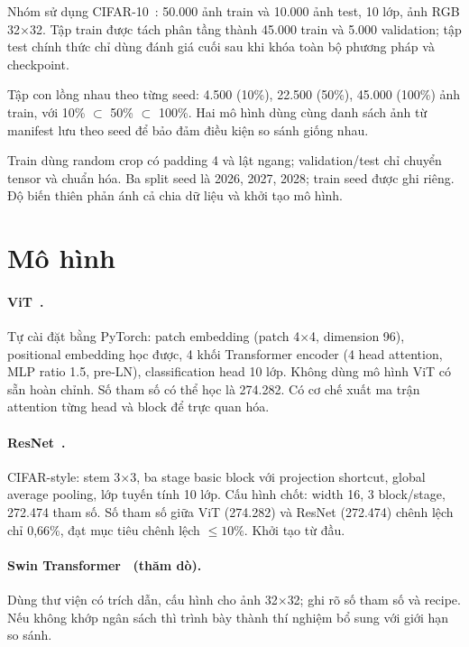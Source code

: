 \documentclass[11pt,a4paper]{article}
\begin{document}
Nhóm sử dụng CIFAR-10~\citep{krizhevsky2009learning}: 50.000 ảnh train và 10.000 ảnh test, 10 lớp, ảnh RGB 32$\times$32. Tập train được tách phân tầng thành 45.000 train và 5.000 validation; tập test chính thức chỉ dùng đánh giá cuối sau khi khóa toàn bộ phương pháp và checkpoint.

Tập con lồng nhau theo từng seed: 4.500 (10\%), 22.500 (50\%), 45.000 (100\%) ảnh train, với 10\% $\subset$ 50\% $\subset$ 100\%. Hai mô hình dùng cùng danh sách ảnh từ manifest lưu theo seed để bảo đảm điều kiện so sánh giống nhau.

Train dùng random crop có padding 4 và lật ngang; validation/test chỉ chuyển tensor và chuẩn hóa. Ba split seed là 2026, 2027, 2028; train seed được ghi riêng. Độ biến thiên phản ánh cả chia dữ liệu và khởi tạo mô hình.

\section{Mô hình}

\paragraph{ViT~\citep{dosovitskiy2020image}.}
Tự cài đặt bằng PyTorch: patch embedding (patch 4$\times$4, dimension 96), positional embedding học được, 4 khối Transformer encoder (4 head attention, MLP ratio 1.5, pre-LN), classification head 10 lớp. Không dùng mô hình ViT có sẵn hoàn chỉnh. Số tham số có thể học là 274.282. Có cơ chế xuất ma trận attention từng head và block để trực quan hóa.

\paragraph{ResNet~\citep{he2015deep}.}
CIFAR-style: stem 3$\times$3, ba stage basic block với projection shortcut, global average pooling, lớp tuyến tính 10 lớp. Cấu hình chốt: width 16, 3 block/stage, 272.474 tham số. Số tham số giữa ViT (274.282) và ResNet (272.474) chênh lệch chỉ 0,66\%, đạt mục tiêu chênh lệch $\le 10\%$. Khởi tạo từ đầu.

\paragraph{Swin Transformer~\citep{liu2021swin} (thăm dò).}
Dùng thư viện có trích dẫn, cấu hình cho ảnh 32$\times$32; ghi rõ số tham số và recipe. Nếu không khớp ngân sách thì trình bày thành thí nghiệm bổ sung với giới hạn so sánh.
\end{document}
